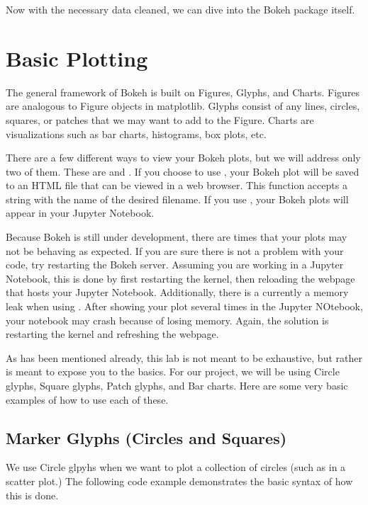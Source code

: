 Now with the necessary data cleaned, we can dive into the Bokeh package itself.

\section*{Basic Plotting}

The general framework of Bokeh is built on Figures, Glyphs, and Charts.
Figures are analogous to Figure objects in matplotlib. Glyphs consist of any
lines, circles, squares, or patches that we may want to add to the Figure.
Charts are visualizations such as bar charts, histograms, box plots, etc.

There are a few different ways to view your Bokeh plots, but we will address only
two of them. These are  and .
If you choose to use , your Bokeh plot will be saved to an HTML
file that can be viewed in a web browser. This function accepts a string with
the name of the desired filename. If you use , your Bokeh plots
will appear in your Jupyter Notebook.

\begin{info}
    Because Bokeh is still under development, there are times that your plots
    may not be behaving as expected. If you are sure there is not a problem with
    your code, try restarting the Bokeh server. Assuming you are working in
    a Jupyter Notebook, this is done by first restarting the kernel, then
    reloading the webpage that hosts your Jupyter Notebook. Additionally, there
    is a currently a memory leak when using . After
    showing your plot several times in the Jupyter NOtebook, your notebook may
    crash because of losing memory. Again, the solution is restarting the kernel
    and refreshing the webpage.
\end{info}

As has been mentioned already, this lab is not meant to be exhaustive, but
rather is meant to expose you to the basics. For our project, we will be using
Circle glyphs, Square glyphs, Patch glyphs, and Bar charts. Here are some very
basic examples of how to use each of these.

\subsection*{Marker Glyphs (Circles and Squares)}

We use Circle glpyhs when we want to plot a collection of circles (such as in
a scatter plot.) The following code example demonstrates the basic syntax of
how this is done.

